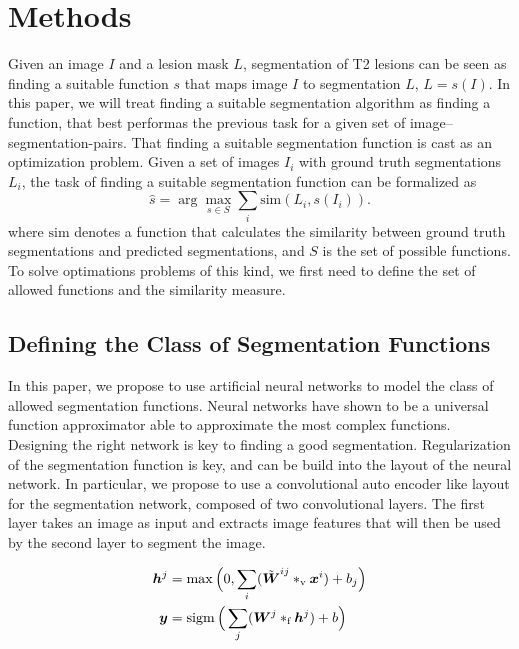 \section{Methods}
\label{sec:method}

Given an image $I$ and a lesion mask $L$, segmentation of T2 lesions can be seen
as finding a suitable function $s$ that maps image $I$ to segmentation $L$, $L =
s(I)$. In this paper, we will treat finding a suitable segmentation algorithm as
finding a function, that best performas the previous task for a given set of
image--segmentation-pairs. That finding a suitable segmentation function is cast
as an optimization problem. Given a set of images $I_i$ with ground truth
segmentations $L_i$, the task of finding a suitable segmentation function can be
formalized as
\begin{equation} 
\hat{s} = \arg \max_{s \in S} \sum_i \text{sim}(L_i, s(I_i)).
\label{eq:segprob}
\end{equation}
where $\text{sim}$ denotes a function that calculates the similarity between
ground truth segmentations and predicted segmentations, and $S$ is the set of
possible functions. To solve optimations problems of this kind, we first need to
define the set of allowed functions and the similarity measure.

\subsection{Defining the Class of Segmentation Functions}

In this paper, we propose to use artificial neural networks to model the class
of allowed segmentation functions. Neural networks have shown to be a universal
function approximator able to approximate the most complex functions. Designing
the right network is key to finding a good segmentation. Regularization of the
segmentation function is key, and can be build into the layout of the neural
network. In particular, we propose to use a convolutional auto encoder like
layout for the segmentation network, composed of two convolutional layers. The
first layer takes an image as input and extracts image features that will then
be used by the second layer to segment the image.

\begin{align}
\vect{h}^j &=
\max\Big(0, \sum_{i}(\tilde{\vect{W}}^{ij}*_\text{v}\vect{x}^i) +
b_j\Big)
\\
\vect{y} &= \sigm\Big(\sum_{j}(\vect{W}^{j}*_\text{f}\vect{h}^j) +
b\Big)
\end{align}

